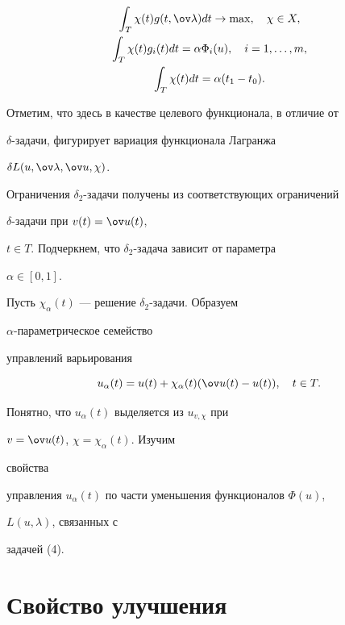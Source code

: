 \begin{gather*} 


\int_T\chi(t)g(t,\ov\lambda)dt\to\max,\quad \chi\in X,\\ 


\int_T\chi(t)g_i(t)dt=\alpha\Phi_i(u),\quad i=1,\dotsc,m,\\ 


\int_T\chi(t)dt=\alpha(t_1-t_0). 


\end{gather*} 


Отметим, что здесь в качестве целевого функционала, в отличие от 


$\delta$-задачи, фигурирует вариация функционала Лагранжа 


$\delta L(u,\ov\lambda,\ov u,\chi)$. 


Ограничения $\delta_2$-задачи получены из соответствующих ограничений 


$\delta$-задачи при $v(t)=\ov u(t)$, 


$t\in T$. Подчеркнем, что $\delta_2$-задача зависит от параметра 


$\alpha\in[0,1]$. 


 


Пусть $\chi_\alpha(t)$ --- решение $\delta_2$-задачи. Образуем 


$\alpha$-параметрическое семейство 


управлений варьирования 


$$ 


u_\alpha(t)=u(t)+\chi_\alpha(t)(\ov u(t)-u(t)),\quad t\in T. 


$$ 


Понятно, что $u_\alpha(t)$ выделяется из $u_{v,\chi}$ при 


$v=\ov u(t)$, $\chi=\chi_\alpha(t)$. Изучим 


свойства 


управления $u_\alpha(t)$ по части уменьшения функционалов $\Phi(u)$, 


$L(u,\lambda)$, связанных с 


задачей (4). 


 


\section{Свойство улучшения} 


 


